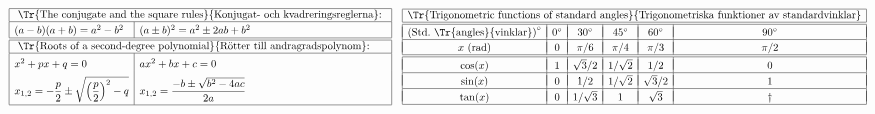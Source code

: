 \documentclass[a4paper]{article}%
\begin{document}
\subsubsection*{} %

{%
\let\F\frac
\newcommand\CC[1]{#1^\circ}
\def\vPad{&&&&&\\*[-10pt]}
\def\myEnd{\\\hline\vPad}
\newcommand\tW{{\sqrt2}}
\newcommand\tH{{\sqrt3}}
$
\begin{array}[m]{|l|l|}
\hline
\multicolumn{2}{|l|}{
  \mbox{ \Tr{The conjugate and the square rules}{Konjugat- och kvadreringsreglerna}: }
} \\
\hline

\rule[-4pt]{0pt}{15pt}
   (a-b)(a+b) = a^2-b^2 & (a\pm b)^2 = a^2\pm2ab+b^2 \\
\hline
\hline
\multicolumn{2}{|l|}{
  \mbox{ \Tr{Roots of a second-degree polynomial}{Rötter till andragradspolynom}: }
} \\
\hline
\rule[-2pt]{0pt}{15pt}
x^2+px+q = 0 & ax^2+bx+c = 0 \\
  \displaystyle
\rule[-10pt]{0pt}{32pt}
  x_{1,2} = -\frac p2\pm\sqrt{\Bigl(\frac p2\Bigr)^2-q}
&
  \displaystyle
   x_{1,2} = \frac{-b\pm\sqrt{b^2-4ac}}{2a}
\\
\hline
\end{array}
\quad
\begin{array}{|c|c|c|c|c|c|}
\hline
\multicolumn{6}{|l|}{
  \mbox{\Tr{Trigonometric functions of standard angles}{Trigonometriska funktioner av standardvinklar}}
} \\
\hline
\hline\vPad
\mbox{(Std.~\Tr{angles}{vinklar})}^\circ
  & \CC{0} &\CC{30} &\CC{45} &\CC{60} &\CC{90}   %
 \myEnd
 x \mbox{ (rad)}
        & 0     & \pi/6 & \pi/4 &  \pi/3 & \pi/2 %
 \\\hline\hline\vPad
 \cos(x)&   1   & \tH/2 & 1/\tW &  1/2  &   0    %
 \myEnd
 \sin(x)&   0   &   1/2 & 1/\tW & \tH/2 &   1    %
 \myEnd
 \tan(x)&   0   & 1/\tH &   1   & \tH   &
                                    \dag %
 \\\hline
\end{array}
$
}%
\end{document}
